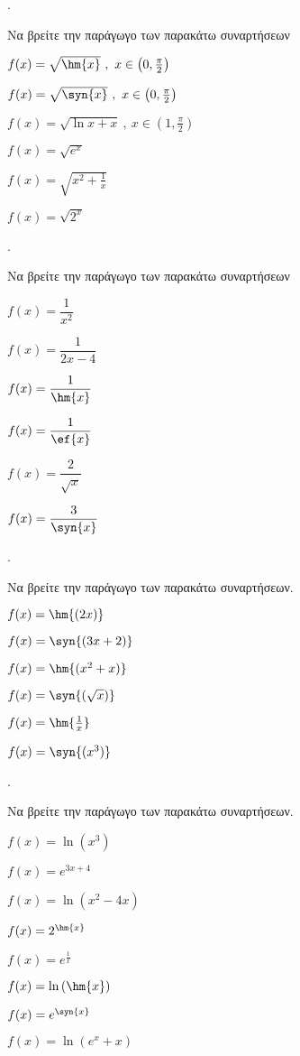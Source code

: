 \documentclass[11pt,a4paper,twocolumn]{article}
\newcounter{askhsh}
\newcommand{\askhsh}{{\large\theaskhsh.}\ \addtocounter{askhsh}{1}}
\begin{document}
\askhsh Να βρείτε την παράγωγο των παρακάτω συναρτήσεων
\begin{alist}
\item $ f(x)=\sqrt{\hm{x}}\ ,\ x\in\left(0,\frac{\pi}{2}\right) $
\item $ f(x)=\sqrt{\syn{x}}\ ,\ x\in\left(0,\frac{\pi}{2}\right) $
\item $ f(x)=\sqrt{\ln{x}+x}\ ,\ x\in\left(1,\frac{\pi}{2}\right) $
\item $ f(x)=\sqrt{e^x} $
\item $ f(x)=\sqrt{x^2+\frac{1}{x}} $
\item $ f(x)=\sqrt{2^x} $
\end{alist}
\askhsh Να βρείτε την παράγωγο των παρακάτω συναρτήσεων
\begin{multicols}{2}
\begin{alist}
\item $ f(x)=\dfrac{1}{x^2} $
\item $ f(x)=\dfrac{1}{2x-4} $
\item $ f(x)=\dfrac{1}{\hm{x}} $
\item $ f(x)=\dfrac{1}{\ef{x}} $
\item $ f(x)=\dfrac{2}{\sqrt{x}} $
\item $ f(x)=\dfrac{3}{\syn{x}} $
\end{alist}
\end{multicols}
\askhsh Να βρείτε την παράγωγο των παρακάτω συναρτήσεων.
\begin{multicols}{2}
\begin{alist}
\item $ f(x)=\hm{(2x)} $
\item $ f(x)=\syn{(3x+2)} $
\item $ f(x)=\hm{(x^2+x)} $
\item $ f(x)=\syn{(\sqrt{x})} $
\item $ f(x)=\hm{\frac{1}{x}} $
\item $ f(x)=\syn{(x^3)} $
\end{alist}
\end{multicols}
\askhsh Να βρείτε την παράγωγο των παρακάτω συναρτήσεων.
\begin{multicols}{2}
\begin{alist}
\item $ f(x)=\ln{(x^3)} $
\item $ f(x)=e^{3x+4} $
\item $ f(x)=\ln{(x^2-4x)} $
\item $ f(x)=2^{\hm{x}} $
\item $ f(x)=e^{\frac{1}{x}} $
\item $ f(x)=\ln{(\hm{x})} $
\item $ f(x)=e^{\syn{x}}$
\item $ f(x)=\ln{\left(e^x+x\right)}$
\end{alist}
\end{multicols}
\end{document}
